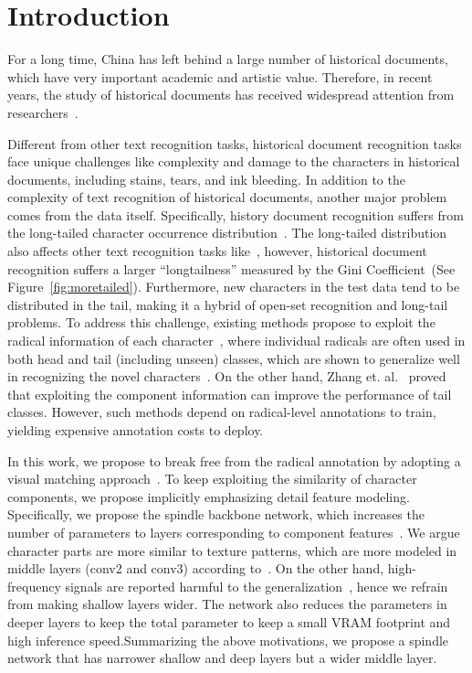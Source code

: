 \section{Introduction}

For a long time, China has left behind a large number of historical documents, which have very important academic and artistic value. 
Therefore, in recent years, the study of historical documents has received widespread attention from researchers~\cite{jinic21,hde,obc306}. 

Different from other text recognition tasks, historical document recognition tasks face unique challenges like complexity and damage to the characters in historical documents, including stains, tears, and ink bleeding. 
In addition to the complexity of text recognition of historical documents, another major problem comes from the data itself. Specifically, history document recognition suffers from the long-tailed character occurrence distribution~\cite{obcmk2}. 
The long-tailed distribution also affects other text recognition tasks like~\cite{fudanvi}, however, historical document recognition suffers a larger ``longtailness'' measured by the Gini Coefficient~\cite{tailsurvey}(See Figure~\ref{fig:moretailed}). 
Furthermore, new characters in the test data tend to be distributed in the tail\cite{jinic21}, making it a hybrid of open-set recognition and long-tail problems.
To address this challenge, existing methods propose to exploit the radical information of each character~\cite{denseran}, where individual radicals are often used in both head and tail (including unseen) classes, which are shown to generalize well in recognizing the novel characters~\cite{fewran,zhang20pr}.
On the other hand, Zhang et. al.~\cite{sanicdar23}  proved that exploiting the component information can improve the performance of tail classes.
However, such methods depend on radical-level annotations to train, yielding expensive annotation costs to deploy.

In this work, we propose to break free from the radical annotation by adopting a visual matching approach~\cite{vsdf}. 
To keep exploiting the similarity of character components, we propose implicitly emphasizing detail feature modeling.  
Specifically, we propose the spindle backbone network, which increases the number of parameters to layers corresponding to component features~\cite{mobile}. 
We argue character parts are more similar to texture patterns, which are more modeled in middle layers (conv2 and conv3) according to~\cite{dissection}.
On the other hand, high-frequency signals are reported harmful to the generalization~\cite{hfharm,hffilter}, hence we refrain from making shallow layers wider. 
The network also reduces the parameters in deeper layers to keep the total parameter to keep a small VRAM footprint and high inference speed.Summarizing the above motivations, we propose a spindle network that has narrower shallow and deep layers but a wider middle layer. 

